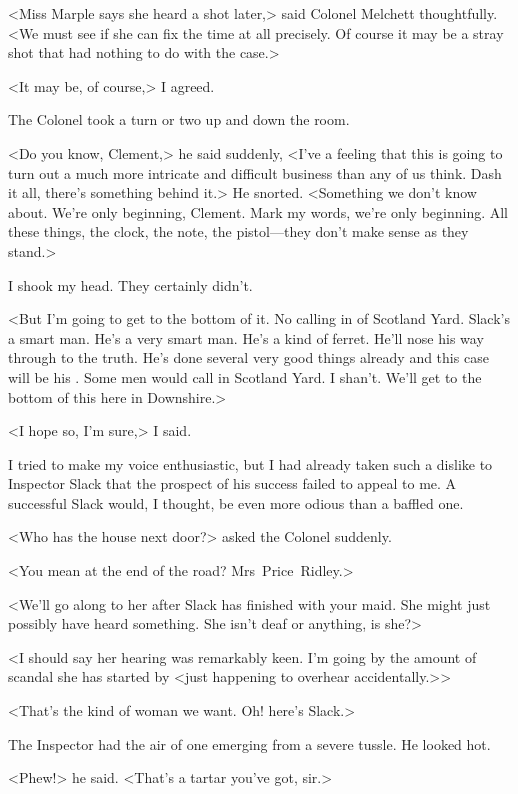 <Miss Marple says she heard a shot later,> said Colonel Melchett thoughtfully. <We must see if she can fix the time at all precisely. Of course it may be a stray shot that had nothing to do with the case.>

<It may be, of course,> I agreed.

The Colonel took a turn or two up and down the room.

<Do you know, Clement,> he said suddenly, <I've a feeling that this is going to turn out a much more intricate and difficult business than any of us think. Dash it all, there's something behind it.> He snorted. <Something we don't know about. We're only beginning, Clement. Mark my words, we're only beginning. All these things, the clock, the note, the pistol—they don't make sense as they stand.>

I shook my head. They certainly didn't.

<But I'm going to get to the bottom of it. No calling in of Scotland Yard. Slack's a smart man. He's a very smart man. He's a kind of ferret. He'll nose his way through to the truth. He's done several very good things already and this case will be his . Some men would call in Scotland Yard. I shan't. We'll get to the bottom of this here in Downshire.>


<I hope so, I'm sure,> I said.

I tried to make my voice enthusiastic, but I had already taken such a dislike to Inspector Slack that the prospect of his success failed to appeal to me. A successful Slack would, I thought, be even more odious than a baffled one.

<Who has the house next door?> asked the Colonel suddenly.

<You mean at the end of the road? Mrs~Price~Ridley.>

<We'll go along to her after Slack has finished with your maid. She might just possibly have heard something. She isn't deaf or anything, is she?>

<I should say her hearing was remarkably keen. I'm going by the amount of scandal she has started by <just happening to overhear accidentally.>>

<That's the kind of woman we want. Oh! here's Slack.>

The Inspector had the air of one emerging from a severe tussle. He looked hot.

<Phew!> he said. <That's a tartar you've got, sir.>

